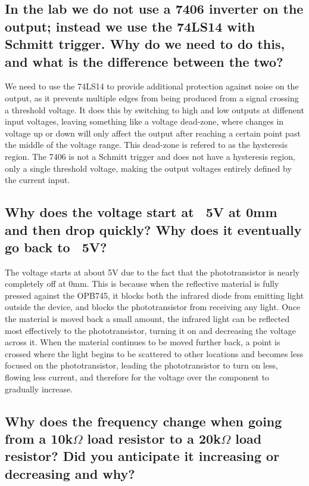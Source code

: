 \documentclass[conference]{IEEEtran}
\begin{document}
\subsection{In the lab we do not use a 7406 inverter on the output; instead we use the 74LS14 with Schmitt
trigger. Why do we need to do this, and what is the difference between the two?}

We need to use the 74LS14 to provide additional protection against noise on the output, as it
prevents multiple edges from being produced from a signal crossing a threshold voltage. It does this
by switching to high and low outputs at diffenent input voltages, leaving something like a voltage dead-zone,
where changes in voltage up or down will only affect the output after reaching a certain point past the middle
of the voltage range. This dead-zone is refered to as the hysteresis region. The 7406 is not a Schmitt trigger
and does not have a hysteresis region, only a single threshold voltage, making the output voltages entirely
defined by the current input.

\subsection{Why does the voltage start at ~5V at 0mm and then drop quickly? Why does it eventually go
back to ~5V?}

The voltage starts at about 5V due to the fact that the
phototransistor is nearly completely off at 0mm. This is
because when the reflective material is fully pressed against
the OPB745, it blocks both the infrared diode from emitting
light outside the device, and blocks the phototransistor from
receiving any light. Once the material is moved back a small amount, the
infrared light can be reflected most effectively to the
phototransistor, turning it on and decreasing the voltage
across it. When the material continues to be moved further 
back, a point is crossed where the light begins to be scattered
to other locations and becomes less focused on the
phototransistor, leading the phototransistor to turn on less,
flowing less current, and therefore for the voltage over the
component to gradually increase.

\subsection{Why does the frequency change when going from a 10k$\Omega$ load resistor to a 20k$\Omega$ load resistor?
Did you anticipate it increasing or decreasing and why?}
\end{document}
